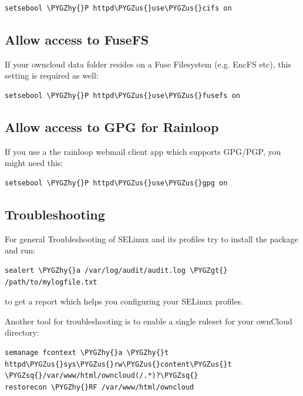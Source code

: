 \documentclass[letterpaper,10pt,english]{sphinxmanual}
\def\PYGZus{\char`\_}
\def\PYGZgt{\char`\>}
\def\PYGZhy{\char`\-}
\def\PYGZsq{\char`\'}
\begin{document}
\begin{Verbatim}[commandchars=\\\{\}]
setsebool \PYGZhy{}P httpd\PYGZus{}use\PYGZus{}cifs on
\end{Verbatim}


\subsection{Allow access to FuseFS}
\label{installation/selinux_configuration:allow-access-to-fusefs}
If your owncloud data folder resides on a Fuse Filesystem (e.g. EncFS etc), this setting is required as well:

\begin{Verbatim}[commandchars=\\\{\}]
setsebool \PYGZhy{}P httpd\PYGZus{}use\PYGZus{}fusefs on
\end{Verbatim}


\subsection{Allow access to GPG for Rainloop}
\label{installation/selinux_configuration:allow-access-to-gpg-for-rainloop}
If you use a the rainloop webmail client app which supports GPG/PGP, you might need this:

\begin{Verbatim}[commandchars=\\\{\}]
setsebool \PYGZhy{}P httpd\PYGZus{}use\PYGZus{}gpg on
\end{Verbatim}


\subsection{Troubleshooting}
\label{installation/selinux_configuration:troubleshooting}
For general Troubleshooting of SELinux and its profiles try to install the package  and run:

\begin{Verbatim}[commandchars=\\\{\}]
sealert \PYGZhy{}a /var/log/audit/audit.log \PYGZgt{} /path/to/mylogfile.txt
\end{Verbatim}

to get a report which helps you configuring your SELinux profiles.

Another tool for troubleshooting is to enable a single ruleset for your ownCloud directory:

\begin{Verbatim}[commandchars=\\\{\}]
semanage fcontext \PYGZhy{}a \PYGZhy{}t httpd\PYGZus{}sys\PYGZus{}rw\PYGZus{}content\PYGZus{}t \PYGZsq{}/var/www/html/owncloud(/.*)?\PYGZsq{}
restorecon \PYGZhy{}RF /var/www/html/owncloud
\end{Verbatim}
\end{document}
